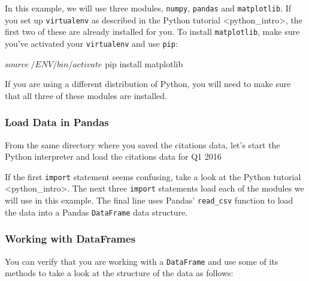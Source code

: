 In this example, we will use three modules, \texttt{numpy},
\texttt{pandas} and \texttt{matplotlib}. If you set up
\texttt{virtualenv} as described in the
Python tutorial \textless{}python\_intro\textgreater{}, the first two of
these are already installed for you. To install \texttt{matplotlib},
make sure you've activated your \texttt{virtualenv} and use
\texttt{pip}:

\begin{lstlistings}
$ source ~/ENV/bin/activate
$ pip install matplotlib
\end{lstlistings}

If you are using a different distribution of Python, you will need to
make sure that all three of these modules are installed.

\subsubsection{Load Data in Pandas}\label{load-data-in-pandas}

From the same directory where you saved the citations data, let's start
the Python interpreter and load the citations data for Q1 2016


If the first \texttt{import} statement seems confusing, take a look at
the Python tutorial \textless{}python\_intro\textgreater{}. The next
three \texttt{import} statements load each of the modules we will use in
this example. The final line uses Pandas' \texttt{read\_csv} function to
load the data into a Pandas \texttt{DataFrame} data structure.

\subsubsection{Working with DataFrames}\label{working-with-dataframes}

You can verify that you are working with a \texttt{DataFrame} and use
some of its methods to take a look at the structure of the data as
follows:

